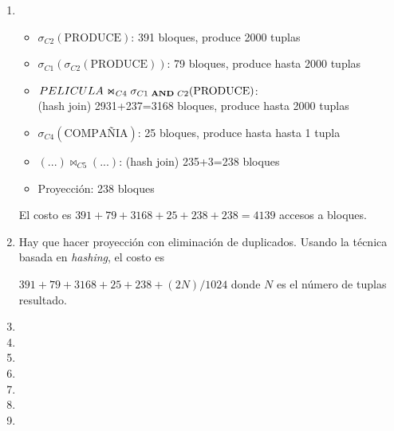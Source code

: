\documentclass[10pt]{article}
\begin{document}
\begin{enumerate}
\begin{enumerate}
\end{enumerate}

 \item

\begin{itemize}

\item $\sigma_{C2}(\text{PRODUCE})$: 391 bloques, produce 2000 tuplas

\item $\sigma_{C1}(\sigma_{C2}(\text{PRODUCE}))$: 79 bloques, produce hasta 2000 tuplas

\item $PELICULA \Join_{C4} \sigma_{C1 \text{ {\bf AND} } C2}(\text{PRODUCE})$: \\
      (hash join) 2931+237=3168 bloques, produce hasta 2000 tuplas

\item $\sigma_{C4}(\text{COMPAÑIA})$: 25 bloques, produce hasta hasta 1 tupla

\item $(...) \Join_{C5} (...)$: (hash join) 235+3=238 bloques

\item Proyección: 238 bloques

\end{itemize}

El costo es $391+79+3168+25+238+238=4139$ accesos a bloques.

 \item

Hay que hacer proyección con eliminación de duplicados. Usando la técnica basada
en \emph{hashing}, el costo es 

$391+79+3168+25+238+(2N)/1024$ donde $N$ es el número de tuplas resultado.

 \item

 \item

 \item

 \item

 \item

 \item

 \item

\end{enumerate}
\end{document}
